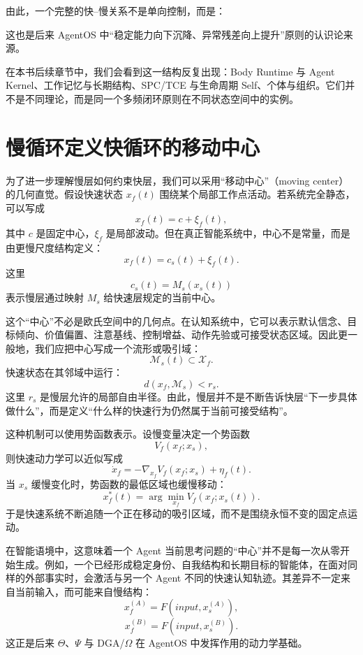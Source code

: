 由此，一个完整的快--慢关系不是单向控制，而是：
\begin{statementbox}
\centering
{}
\end{statementbox}
这也是后来 AgentOS 中“稳定能力向下沉降、异常残差向上提升”原则的认识论来源。

在本书后续章节中，我们会看到这一结构反复出现：Body Runtime 与 Agent Kernel、工作记忆与长期结构、SPC/TCE 与生命周期 Self、个体与组织。它们并不是不同理论，而是同一个多频闭环原则在不同状态空间中的实例。

\section{慢循环定义快循环的移动中心}

为了进一步理解慢层如何约束快层，我们可以采用“移动中心”（moving center）的几何直觉。假设快速状态 $x_f(t)$ 围绕某个局部工作点活动。若系统完全静态，可以写成
\[
x_f(t)
=
c+
\xi_f(t),
\]
其中 $c$ 是固定中心，$\xi_f$ 是局部波动。但在真正智能系统中，中心不是常量，而是由更慢尺度结构定义：
\[
x_f(t)
=
c_s(t)
+
\xi_f(t).
\]
这里
\[
c_s(t)
=
M_s(x_s(t))
\]
表示慢层通过映射 $M_s$ 给快速层规定的当前中心。

这个“中心”不必是欧氏空间中的几何点。在认知系统中，它可以表示默认信念、目标倾向、价值偏置、注意基线、控制增益、动作先验或可接受状态区域。因此更一般地，我们应把中心写成一个流形或吸引域：
\[
\mathcal{M}_s(t)
\subset
\mathcal{X}_f.
\]
快速状态在其邻域中运行：
\[
d
\left(
x_f,
\mathcal{M}_s
\right)
<
r_s.
\]
这里 $r_s$ 是慢层允许的局部自由半径。由此，慢层并不是不断告诉快层“下一步具体做什么”，而是定义“什么样的快速行为仍然属于当前可接受结构”。

这种机制可以使用势函数表示。设慢变量决定一个势函数
\[
V_f
\left(
x_f;x_s
\right),
\]
则快速动力学可以近似写成
\[
\dot{x}_f
=
-
\nabla_{x_f}
V_f
\left(
x_f;x_s
\right)
+
\eta_f(t).
\]
当 $x_s$ 缓慢变化时，势函数的最低区域也缓慢移动：
\[
x_f^{*}(t)
=
\arg\min_{x_f}
V_f
\left(
x_f;x_s(t)
\right).
\]
于是快速系统不断追随一个正在移动的吸引区域，而不是围绕永恒不变的固定点运动。

在智能语境中，这意味着一个 Agent 当前思考问题的“中心”并不是每一次从零开始生成。例如，一个已经形成稳定身份、自我结构和长期目标的智能体，在面对同样的外部事实时，会激活与另一个 Agent 不同的快速认知轨迹。其差异不一定来自当前输入，而可能来自慢结构：
\[
x_f^{(A)}
=
F
\left(
input,
x_s^{(A)}
\right),
\]
\[
x_f^{(B)}
=
F
\left(
input,
x_s^{(B)}
\right).
\]
这正是后来 $\Theta$、$\Psi$ 与 DGA/$\Omega$ 在 AgentOS 中发挥作用的动力学基础。

